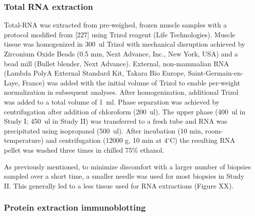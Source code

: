 \documentclass[twoside,10pt]{gihclass} %
\begin{document}
\hypertarget{total-rna-extraction}{%
\subsubsection{Total RNA extraction}\label{total-rna-extraction}}

Total-RNA was extracted from pre-weighed, frozen muscle samples with a protocol modified from
{[}227{]}
using Trizol reagent (Life Technologies).
Muscle tissue was homogenized in \SI{300}{ul} Trizol with mechanical disruption achieved by Zirconium Oxide Beads (0.5 mm, Next Advance, Inc., New York, USA) and a bead mill (Bullet blender, Next Advance). External, non-mammalian RNA (Lambda PolyA External Standard Kit, Takara Bio Europe, Saint-Germain-en-Laye, France) was added with the initial volume of Trizol to enable per-weight normalization in subsequent analyses. After homogenization, additional Trizol was added to a total volume of \SI{1}{ml}. Phase separation was achieved by centrifugation after addition of chloroform (\SI{200}{ul}). The upper phase (\SI{400}{ul} in Study I; \SI{450}{ul} in Study II) was transferred to a fresh tube and RNA was precipitated using isopropanol (\SI{500}{ul}). After incubation (10 min, room-temperature) and centrifugation (12000 g, 10 min at 4\(^{\circ}\)C) the resulting RNA pellet was washed three times in chilled 75\% ethanol.

As previously mentioned, to minimize discomfort with a larger number of biopsies sampled over a short time, a smaller needle was used for most biopsies in Study II. This generally led to a less tissue used for RNA extractions (Figure XX).

\hypertarget{protein-extraction-immunoblotting}{%
\subsubsection{Protein extraction immunoblotting}\label{protein-extraction-immunoblotting}}
\end{document}
